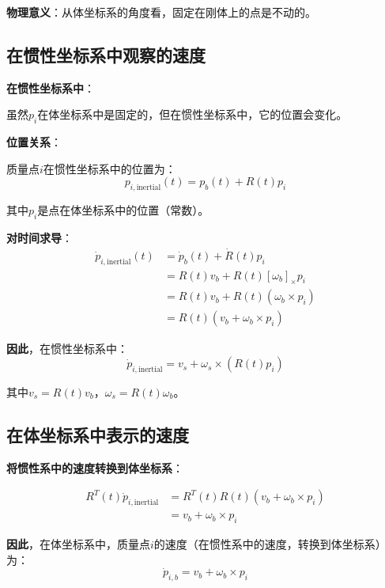 \documentclass[12pt,a4paper]{article}
\begin{document}
\textbf{物理意义}：从体坐标系的角度看，固定在刚体上的点是不动的。

\subsection{在惯性坐标系中观察的速度}

\textbf{在惯性坐标系中}：

虽然$p_i$在体坐标系中是固定的，但在惯性坐标系中，它的位置会变化。

\textbf{位置关系}：

质量点$i$在惯性坐标系中的位置为：
\begin{equation}
p_{i,\text{inertial}}(t) = p_b(t) + R(t) p_i
\end{equation}

其中$p_i$是点在体坐标系中的位置（常数）。

\textbf{对时间求导}：
\begin{align}
\dot{p}_{i,\text{inertial}}(t) &= \dot{p}_b(t) + \dot{R}(t) p_i \\
&= R(t) v_b + R(t) [\omega_b]_{\times} p_i \\
&= R(t) v_b + R(t) (\omega_b \times p_i) \\
&= R(t) (v_b + \omega_b \times p_i)
\end{align}

\textbf{因此}，在惯性坐标系中：
\begin{equation}
\dot{p}_{i,\text{inertial}} = v_s + \omega_s \times (R(t) p_i)
\end{equation}

其中$v_s = R(t) v_b$，$\omega_s = R(t) \omega_b$。

\subsection{在体坐标系中表示的速度}

\textbf{将惯性系中的速度转换到体坐标系}：

\begin{align}
R^T(t) \dot{p}_{i,\text{inertial}} &= R^T(t) R(t) (v_b + \omega_b \times p_i) \\
&= v_b + \omega_b \times p_i
\end{align}

\textbf{因此}，在体坐标系中，质量点$i$的速度（在惯性系中的速度，转换到体坐标系）为：
\begin{equation}
\dot{p}_{i,b} = v_b + \omega_b \times p_i
\label{eq:velocity_body_frame}
\end{equation}
\end{document}
